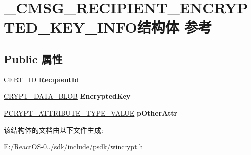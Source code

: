 \hypertarget{struct___c_m_s_g___r_e_c_i_p_i_e_n_t___e_n_c_r_y_p_t_e_d___k_e_y___i_n_f_o}{}\section{\+\_\+\+C\+M\+S\+G\+\_\+\+R\+E\+C\+I\+P\+I\+E\+N\+T\+\_\+\+E\+N\+C\+R\+Y\+P\+T\+E\+D\+\_\+\+K\+E\+Y\+\_\+\+I\+N\+F\+O结构体 参考}
\label{struct___c_m_s_g___r_e_c_i_p_i_e_n_t___e_n_c_r_y_p_t_e_d___k_e_y___i_n_f_o}
\subsection*{Public 属性}
\begin{DoxyCompactItemize}
\item 
\mbox{\label{struct___c_m_s_g___r_e_c_i_p_i_e_n_t___e_n_c_r_y_p_t_e_d___k_e_y___i_n_f_o_ae9fb37aa1bfafbbec24a50ef8347bb37}} 
\hyperlink{struct___c_e_r_t___i_d}{C\+E\+R\+T\+\_\+\+ID} {\bfseries Recipient\+Id}
\item 
\mbox{\label{struct___c_m_s_g___r_e_c_i_p_i_e_n_t___e_n_c_r_y_p_t_e_d___k_e_y___i_n_f_o_ab845f9d3c6e822d0c065f19b23cc9554}} 
\hyperlink{struct___c_r_y_p_t_o_a_p_i___b_l_o_b}{C\+R\+Y\+P\+T\+\_\+\+D\+A\+T\+A\+\_\+\+B\+L\+OB} {\bfseries Encrypted\+Key}
\item 
\mbox{\label{struct___c_m_s_g___r_e_c_i_p_i_e_n_t___e_n_c_r_y_p_t_e_d___k_e_y___i_n_f_o_a9f73136a34f9c0e5b515af8cb3819fe2}} 
\hyperlink{struct___c_r_y_p_t___a_t_t_r_i_b_u_t_e___t_y_p_e___v_a_l_u_e}{P\+C\+R\+Y\+P\+T\+\_\+\+A\+T\+T\+R\+I\+B\+U\+T\+E\+\_\+\+T\+Y\+P\+E\+\_\+\+V\+A\+L\+UE} {\bfseries p\+Other\+Attr}
\end{DoxyCompactItemize}


该结构体的文档由以下文件生成\+:\begin{DoxyCompactItemize}
\item 
E\+:/\+React\+O\+S-\/0../sdk/include/psdk/wincrypt.\+h\end{DoxyCompactItemize}

